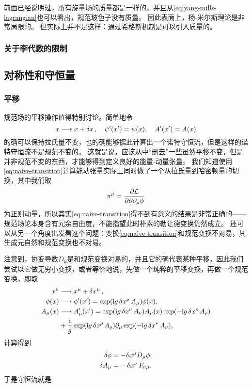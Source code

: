 \documentclass[hyperref, UTF8, a4paper]{ctexart}
\newcommand*{\ii}{\mathrm{i}}
\begin{document}
前面已经说明过，所有旋量场的质量都是一样的，并且从\eqref{eq:yang-mills-lagrangian}也可以看出，规范玻色子没有质量。
因此表面上，杨-米尔斯理论是非常局限的。
但实际上并不是这样：通过希格斯机制是可以引入质量的。

\subsubsection{关于李代数的限制}


\subsection{对称性和守恒量}

\subsubsection{平移}\label{sec:transition}

规范场的平移操作值得特别讨论。简单地令
\begin{equation}
    x \longrightarrow x + \var{x}, \quad \psi'(x') = \psi(x), \quad A'(x') = A(x)
    \label{eq:naive-transition}
\end{equation}
的确可以保持拉氏量不变，也的确能够据此计算出一个诺特守恒流，但是这样的诺特守恒流不是规范不变的。
这就是说，应该从中“删去”一些虽然平移不变，但是并非规范不变的东西，才能够得到定义良好的能量-动量张量。
我们知道使用\eqref{eq:naive-transition}计算能动张量实际上同时做了一个从拉氏量到哈密顿量的切换，其中我们取
\[
    \pi^\mu = \pdv{\mathcal{L}}{\partial \partial_\mu \phi}
\]
为正则动量，所以其实\eqref{eq:naive-transition}得不到有意义的结果是非常正确的——规范场论本身含有冗余自由度，不能指望此时朴素的勒让德变换仍然成立。
还可以从另一个角度出发看这个问题：变换\eqref{eq:naive-transition}和规范变换不对易，其生成元自然和规范变换也不对易。

注意到，协变导数$D_\mu$是和规范变换对易的，并且它的确代表某种平移，因此我们尝试以它做无穷小变换，或者等价地说，先做一个纯粹的平移变换，再做一个规范变换，即取
\begin{equation}
    \begin{aligned}
        x^\mu &\longrightarrow x^\mu + \var{x^\mu}, \\
        \phi(x) &\longrightarrow \phi'(x') = \exp(\ii g \var{x^\mu} A_\mu) \phi(x), \\
        A_\mu(x) &\longrightarrow A_{\mu}'(x') = \exp(\ii g \var{x^\nu} A_\nu) A_\mu(x) \exp(- \ii g \var{x^\rho} A_\rho) \\
        &+ \frac{\ii}{g} \exp(\ii g \var{x^\rho} A_\rho) \partial_\mu \exp(- \ii g \var{x^\nu} A_\nu),
    \end{aligned}
\end{equation}
计算得到
\begin{equation}
    \begin{aligned}
        \var{\phi} &= - \var x^\mu D_\mu \phi, \\
        \var{A_\mu} &= - \var{x^\nu} F_{\nu \mu},
    \end{aligned} 
\end{equation}
于是守恒流就是
\end{document}

